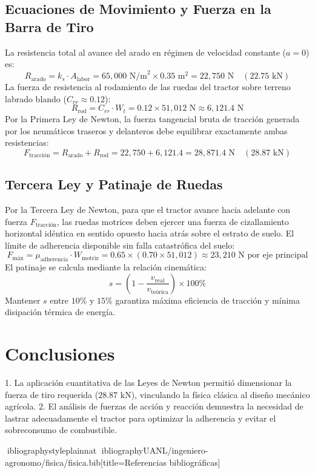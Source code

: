 \documentclass[spanish,letterpaper,oneside]{article}
\begin{document}
\subsection{Ecuaciones de Movimiento y Fuerza en la Barra de Tiro}
La resistencia total al avance del arado en régimen de velocidad constante ($a=0$) es:
\begin{equation}
    R_{\text{arado}} = k_s \cdot A_{\text{labor}} = 65,000\text{ N/m}^2 \times 0.35\text{ m}^2 = 22,750\text{ N} \quad (22.75\text{ kN})
\end{equation}
La fuerza de resistencia al rodamiento de las ruedas del tractor sobre terreno labrado blando ($C_{rr} \approx 0.12$):
\begin{equation}
    R_{\text{rod}} = C_{rr} \cdot W_t = 0.12 \times 51,012\text{ N} \approx 6,121.4\text{ N}
\end{equation}
Por la Primera Ley de Newton, la fuerza tangencial bruta de tracción generada por los neumáticos traseros y delanteros debe equilibrar exactamente ambas resistencias:
\begin{equation}
    F_{\text{tracción}} = R_{\text{arado}} + R_{\text{rod}} = 22,750 + 6,121.4 = 28,871.4\text{ N} \quad (28.87\text{ kN})
\end{equation}

\subsection{Tercera Ley y Patinaje de Ruedas}
Por la Tercera Ley de Newton, para que el tractor avance hacia adelante con fuerza $F_{\text{tracción}}$, las ruedas motrices deben ejercer una fuerza de cizallamiento horizontal idéntica en sentido opuesto hacia atrás sobre el estrato de suelo.
El límite de adherencia disponible sin falla catastrófica del suelo:
\begin{equation}
    F_{\text{máx}} = \mu_{\text{adherencia}} \cdot W_{\text{motriz}} = 0.65 \times (0.70 \times 51,012) \approx 23,210\text{ N por eje principal}
\end{equation}
El patinaje se calcula mediante la relación cinemática:
\begin{equation}
    s = \left( 1 - \frac{v_{\text{real}}}{v_{\text{teórica}}} \right) \times 100\%
\end{equation}
Mantener $s$ entre $10\%$ y $15\%$ garantiza máxima eficiencia de tracción y mínima disipación térmica de energía.

\section{Conclusiones}
1. La aplicación cuantitativa de las Leyes de Newton permitió dimensionar la fuerza de tiro requerida ($28.87\text{ kN}$), vinculando la física clásica al diseño mecánico agrícola.
2. El análisis de fuerzas de acción y reacción demuestra la necesidad de lastrar adecuadamente el tractor para optimizar la adherencia y evitar el sobreconsumo de combustible.

\newpage
ibliographystyle{plainnat}
ibliography{UANL/ingeniero-agronomo/fisica/fisica.bib}[title={Referencias bibliográficas}]
\end{document}
